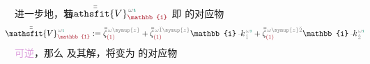 进一步地，若 $\Xint{\mathcolor{gray}{-}}{25}{\bar{\bar{\mathsfit{V}}}}^{\;\! \mathcolor{gray}{\omega} \textcolor{PineGreen}{\imath}}_{\textcolor{Maroon}{\mathbb{1}}}$ 
即  的对应物
\begin{align} \label{eq:plane_wave_basis-V1}
	\Xint{\mathcolor{gray}{-}}{25}{\bar{\bar{\mathsfit{V}}}}^{\;\! \mathcolor{gray}{\omega} \textcolor{PineGreen}{\imath}}_{\textcolor{Maroon}{\mathbb{1}}} := \bar{\bar{\zeta}}^{\;\! \mathcolor{gray}{\omega} \mathcolor{gray}{\symup{z}}}_{\textcolor{Maroon}{(1)}} + \bar{\bar{\zeta}}^{\;\! \mathcolor{gray}{\omega} \mathcolor{gray}{\check{1} \symup{z}}}_{\textcolor{Maroon}{(1)}} \mathbb{i} \Xint{\begin{smallmatrix} ~ \\ {}^{}_{\mathcolor{gray}{-}} \\ ~ \end{smallmatrix}}{15}{k}_{\;\! \mathcolor{gray}{\check{1}}}^{\;\! \mathcolor{gray}{\omega} \textcolor{PineGreen}{\imath}} + \bar{\bar{\zeta}}^{\;\! \mathcolor{gray}{\omega} \mathcolor{gray}{\symup{z} \check{2}}}_{\textcolor{Maroon}{(1)}} \mathbb{i} \Xint{\begin{smallmatrix} ~ \\ {}^{}_{\mathcolor{gray}{-}} \\ ~ \end{smallmatrix}}{15}{k}_{\;\! \mathcolor{gray}{\check{2}}}^{\;\! \mathcolor{gray}{\omega} \textcolor{PineGreen}{\imath}}
\end{align}
\textcolor{Plum}{可逆}，那么  及其解，将变为  的对应物
